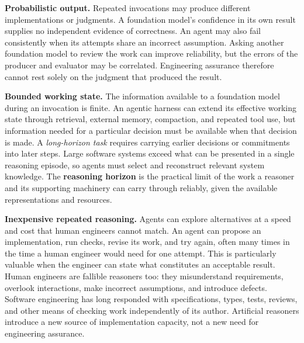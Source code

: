\textbf{Probabilistic output.} Repeated invocations may produce different implementations or judgments. A foundation model's confidence in its own result supplies no independent evidence of correctness. An agent may also fail consistently when its attempts share an incorrect assumption. Asking another foundation model to review the work can improve reliability, but the errors of the producer and evaluator may be correlated. Engineering assurance therefore cannot rest solely on the judgment that produced the result.




\textbf{Bounded working state.} The information available to a foundation model during an invocation is finite. An agentic harness can extend its effective working state through retrieval, external memory, compaction, and repeated tool use, but information needed for a particular decision must be available when that decision is made. A \emph{long-horizon task} requires carrying earlier decisions or commitments into later steps. Large software systems exceed what can be presented in a single reasoning episode, so agents must select and reconstruct relevant system knowledge. The \textbf{reasoning horizon} is the practical limit of the work a reasoner and its supporting machinery can carry through reliably, given the available representations and resources.

\textbf{Inexpensive repeated reasoning.} Agents can explore alternatives at a speed and cost that human engineers cannot match. An agent can propose an implementation, run checks, revise its work, and try again, often many times in the time a human engineer would need for one attempt. This is particularly valuable when the engineer can state what constitutes an acceptable result. Human engineers are fallible reasoners too: they misunderstand requirements, overlook interactions, make incorrect assumptions, and introduce defects. Software engineering has long responded with specifications, types, tests, reviews, and other means of checking work independently of its author. Artificial reasoners introduce a new source of implementation capacity, not a new need for engineering assurance.

